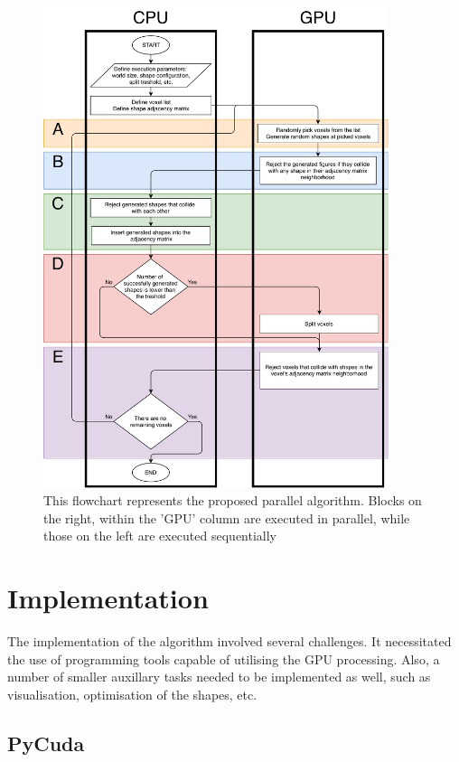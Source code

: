 \documentclass[12pt, oneside]{report}
\begin{document}
\begin{figure}[H]
  \centering
	\label{GPURSABlockDiagramPdf}
	\includegraphics[width=0.9\textwidth,height=0.9\textheight,keepaspectratio]{Images/GPURSA/GPUDiagram1.pdf}
	\caption{This flowchart represents the proposed parallel algorithm. \newline
		Blocks on the right, within the 'GPU' column are executed in parallel, while those on the left are executed sequentially}
\end{figure}

\section {Implementation}

The implementation of the algorithm involved several challenges. It necessitated the use of programming tools capable of utilising the GPU processing. Also, a number of smaller auxillary tasks needed to be implemented as well, such as visualisation, optimisation of the shapes, etc.

\subsection{PyCuda}
\end{document}
